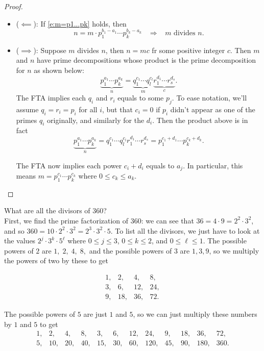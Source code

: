\documentclass[11pt,dvipsnames]{book}
\numberwithin{equation}{section} %
\numberwithin{figure}{section} %
\numberwithin{table}{section} %
\begin{document}
\begin{proof}
\begin{itemize}
\item  ($\impliedby$): If \eqref{e:m=p1...pk} holds, then
\[
n=m \cdot  p_1^{b_1-a_{1}}\cdots p_k^{b_k-a_{k}} \;\;\; \Longrightarrow \;\;\; m \text{ divides }n.
\]
 \item ($\implies$): Suppose $m$ divides $n$, then $n=mc$ fr some positive integer $c$.  Then $m$ and $n$ have prime decompositions whose product is the prime decomposition for $n$ as shown below:
$$\underbrace{p_1^{a_1}\cdots p_k^{a_k}}_n = \underbrace{q_1^{c_1}\cdots q_l^{c_l}}_m\underbrace{r_1^{d_1}\cdots r_s^{d_s}}_c.$$
The FTA implies each $q_i$ and $r_i$ equals to some $p_j$. To ease notation, we'll assume $q_{i}=r_{i}=p_{i}$ for all $i$, but that $c_{i}=0$ if $p_{i}$ didn't appear as one of the primes $q_{i}$ originally, and similarly for the $d_{i}$. Then the product above is in fact 
$$\underbrace{p_1^{a_1}\cdots p_k^{a_k}}_n = {q_1^{c_1}\cdots q_l^{c_l}}{r_1^{d_1}\cdots r_s^{d_s}} 
=p_{1}^{c_{1}+d_{1}}\cdots p_{k}^{c_{k}+d_{k}}.
$$

The FTA now implies each power $c_i+d_i$ equals to $a_j$. In particular, this means $m=p_{1}^{c_{1}}\cdots p_{k}^{c_{k}}$ where $0\leq c_{k}\leq a_{k}$. 
  \end{itemize}
\end{proof}


\begin{example}
What are all the divisors of $360$?\\


First, we find the prime factorization of $360$: we can see that $36=4\cdot 9=2^2\cdot 3^2$, and so $360 = 10\cdot 2^2\cdot 3^2 = 2^3\cdot 3^2\cdot 5$. To list all the divisors, we just have to look at the values $2^j\cdot 3^{k}\cdot 5^{\ell}$ where $0\leq j\leq 3$, $0\leq k\leq 2$, and $0\leq \ell\leq 1$. The possible powers of $2$ are $1, \; 2, \; 4, \; 8,$ and the possible powers of $3$ are $1,3,9$, so we multiply the powers of two by these to get 

\[
\begin{array}{cccc}
1, &  2, &  4, &  8, \\
3, & 6, &  12, &  24, \\
 9, &  18, &  36, &  72.
 \end{array}
 \]
 
 The possible powers of $5$ are just $1$ and $5$, so we can just multiply these numbers by $1$ and $5$ to get 
 \[
 \begin{array}{cccccccccccc}
1, &  2, &  4, &  8, 
& 3, & 6, &  12, &  24, 
&  9, &  18, &  36, &  72, \\ 
5, &  10, &  20, &  40,
& 15, & 30, & 60,  &  120, 
&  45, &  90, &  180, &  360. 
 \end{array}
 \]
\end{example}
\end{document}
